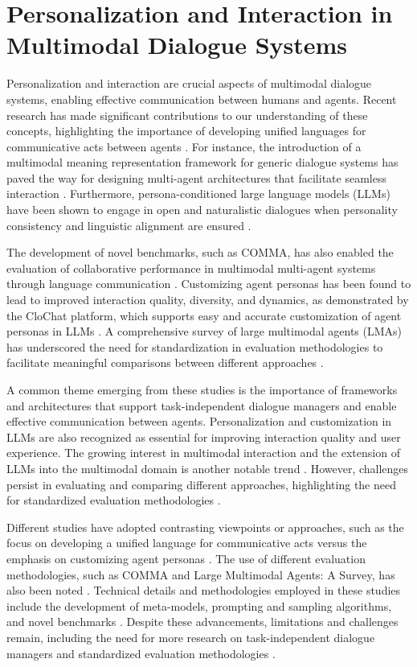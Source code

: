 \documentclass[conference]{IEEEtran}
\begin{document}
\section{Personalization and Interaction in Multimodal Dialogue Systems}
Personalization and interaction are crucial aspects of multimodal dialogue systems, enabling effective communication between humans and agents. Recent research has made significant contributions to our understanding of these concepts, highlighting the importance of developing unified languages for communicative acts between agents \cite{b1}. For instance, the introduction of a multimodal meaning representation framework for generic dialogue systems has paved the way for designing multi-agent architectures that facilitate seamless interaction \cite{b2}. Furthermore, persona-conditioned large language models (LLMs) have been shown to engage in open and naturalistic dialogues when personality consistency and linguistic alignment are ensured \cite{b3}.

The development of novel benchmarks, such as COMMA, has also enabled the evaluation of collaborative performance in multimodal multi-agent systems through language communication \cite{b4}. Customizing agent personas has been found to lead to improved interaction quality, diversity, and dynamics, as demonstrated by the CloChat platform, which supports easy and accurate customization of agent personas in LLMs \cite{b5}. A comprehensive survey of large multimodal agents (LMAs) has underscored the need for standardization in evaluation methodologies to facilitate meaningful comparisons between different approaches \cite{b6}.

A common theme emerging from these studies is the importance of frameworks and architectures that support task-independent dialogue managers and enable effective communication between agents. Personalization and customization in LLMs are also recognized as essential for improving interaction quality and user experience. The growing interest in multimodal interaction and the extension of LLMs into the multimodal domain is another notable trend \cite{b7}. However, challenges persist in evaluating and comparing different approaches, highlighting the need for standardized evaluation methodologies \cite{b8}.

Different studies have adopted contrasting viewpoints or approaches, such as the focus on developing a unified language for communicative acts versus the emphasis on customizing agent personas \cite{b9}. The use of different evaluation methodologies, such as COMMA and Large Multimodal Agents: A Survey, has also been noted \cite{b10}. Technical details and methodologies employed in these studies include the development of meta-models, prompting and sampling algorithms, and novel benchmarks \cite{b11}. Despite these advancements, limitations and challenges remain, including the need for more research on task-independent dialogue managers and standardized evaluation methodologies \cite{b12}.
\end{document}
